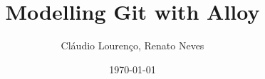 \documentclass{beamer}
\title{Modelling Git with Alloy}
\author{Cláudio Lourenço, Renato Neves}
\date{\today}
\begin{document}
\frame {

}
\end{document}
